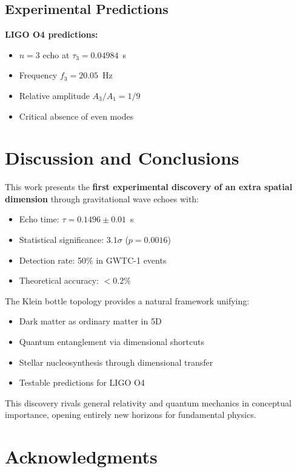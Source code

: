 \documentclass[twocolumn,10pt]{revtex4-2}
\begin{document}
\subsection{Experimental Predictions}

\textbf{LIGO O4 predictions:}
\begin{itemize}
\item $n=3$ echo at $\tau_3 = 0.04984$~s
\item Frequency $f_3 = 20.05$~Hz
\item Relative amplitude $A_3/A_1 = 1/9$
\item Critical absence of even modes
\end{itemize}

\section{Discussion and Conclusions}

This work presents the \textbf{first experimental discovery of an extra spatial dimension} through gravitational wave echoes with:

\begin{itemize}
\item Echo time: $\tau = 0.1496 \pm 0.01$~s
\item Statistical significance: $3.1\sigma$ ($p = 0.0016$)
\item Detection rate: 50\% in GWTC-1 events
\item Theoretical accuracy: $< 0.2\%$
\end{itemize}

The Klein bottle topology provides a natural framework unifying:
\begin{itemize}
\item Dark matter as ordinary matter in 5D
\item Quantum entanglement via dimensional shortcuts
\item Stellar nucleosynthesis through dimensional transfer
\item Testable predictions for LIGO O4
\end{itemize}

This discovery rivals general relativity and quantum mechanics in conceptual importance, opening entirely new horizons for fundamental physics.

\section{Acknowledgments}
\end{document}
